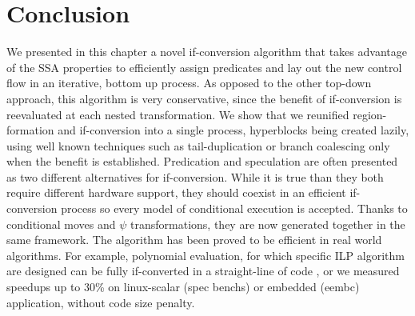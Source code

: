 \section{Conclusion} 
We presented in this chapter a novel if-conversion algorithm that takes advantage of the SSA properties to efficiently assign predicates and lay out the new control flow in an iterative, bottom up process. As opposed to the other top-down approach, this algorithm is very conservative, since the benefit of if-conversion is reevaluated at each nested transformation.
We show that we reunified region-formation and if-conversion into a single process, hyperblocks being created lazily, using well known techniques such as tail-duplication or branch coalescing only when the benefit is established.
Predication and speculation are often presented as two different alternatives for if-conversion. While it is true than they both require different hardware support, they should coexist in an efficient if-conversion process so every model of conditional execution is accepted. Thanks to conditional moves and $\psi$ transformations, they are now generated together in the same framework. The algorithm has been proved to be efficient in real world algorithms. For example, polynomial evaluation, for which specific ILP algorithm are designed can be fully if-converted in a straight-line of code \cite{JeKnMoRe11}, or we measured speedups up to 30\% on linux-scalar (spec benchs)  or embedded (eembc) application, without code size penalty.





